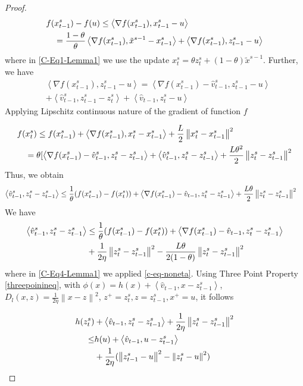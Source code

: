 \documentclass{article}
\newcommand{\norm}[1]{\left\lVert#1\right\rVert}
\newcommand{\Iprod}[2]{\left\langle #1,#2\right\rangle}
\theoremstyle{definition}
\theoremstyle{remark}
\begin{document}
{{\begin{proof}
\begin{align}
f(&x_{t-1}^s) -f (u) \leq \Iprod{\nabla f(x_{t-1}^s)}{x_{t-1}^s-u}\notag\\
&= \frac{1-\theta}{\theta} \Iprod{\nabla f(x_{t-1}^s)}{\tilde{x}^{s-1} - x_{t-1}^s} + \Iprod{\nabla f(x_{t-1}^s)}{z_{t-1}^s-u}\label{C-Eq1-Lemma1}
\end{align}
where in \eqref{C-Eq1-Lemma1} we use the update $x_t^s = \theta z_t^s+(1-\theta)\tilde{x}^{s-1}$. Further, we have
\begin{equation}\label{C-Eq3-Lemma1}
\begin{split}
&\Iprod{\nabla f(x_{t-1}^s)}{z_{t-1}^s - u} = \Iprod{\nabla f(x_{t-1}^s) - \hat{v}_{t-1}^s}{z_{t-1}^s - u}\\
&+ \Iprod{\hat{v}_{t-1}^s}{z_{t-1}^s - z_{t}^s} + \Iprod{\hat{v}_{t-1}}{z_{t}^s - u}
\end{split}
\end{equation}
Applying Lipschitz continuous nature of the gradient of function $f$ 

\begin{align}
f(&x_{t}^s)  \leq f(x_{t-1}^s) + \Iprod{\nabla f(x_{t-1}^s)}{x_{t}^s-x_{t-1}^s}+\frac{L}{2}\norm{x_{t}^s-x_{t-1}^s}^2\notag\\
&=\theta [\Iprod{\nabla f(x_{t-1}^s)-\hat{v}_{t-1}^s}{z_{t}^s-z_{t-1}^s}+ \Iprod{\hat{v}_{t-1}^s}{z_{t}^s-z_{t-1}^s}+\frac{L\theta^2}{2}\norm{z_{t}^s-z_{t-1}^s}^2\notag
\end{align}
Thus, we obtain
\begin{align}
\Iprod{\hat{v}_{t-1}^s}{z_{t}^s-z_{t-1}^s}&\leq \frac{1}{\theta} (f(x_{t-1}^s)  - f(x_{t}^s))+\Iprod{\nabla f(x_{t-1}^s)-\hat{v}_{t-1}}{z_{t}^s-z_{t-1}^s}+\frac{L\theta}{2}\norm{z_{t}^s-z_{t-1}^s}^2\notag
\end{align}
We have
\begin{align}
\Iprod{\hat{v}_{t-1}^s}{z_{t}^s-z_{t-1}^s}&\leq \frac{1}{\theta} (f(x_{t-1}^s)  - f(x_{t}^s))+\Iprod{\nabla f(x_{t-1}^s)-\hat{v}_{t-1}}{z_{t}^s-z_{t-1}^s}\notag\\
&+\frac{1}{2\eta}\norm{z_{t}^s-z_{t-1}^s}^2-\frac{L\theta}{2(1-\theta)}\norm{z_{t}^s-z_{t-1}^s}^2\label{C-Eq4-Lemma1}
\end{align}
where in \eqref{C-Eq4-Lemma1} we applied \eqref{c-eq-noneta}. Using Three Point Property \ref{threepoinineq}, with $\phi(x) = h(x)+\Iprod{\hat{v}_{t-1}}{x-z_{t-1}^s}$, $D_l(x,z) = {\frac{1}{2\eta}}\norm{x-z}^2$, $z^+ = z_t^s, z = z_{t-1}^s, x^+ = u$, it follows

\begin{align}
h(z_{t}^s) &+ \Iprod{\hat{v}_{t-1}}{z_{t}^s-z_{t-1}^s}+{\frac{1}{2\eta}}\norm{z_{t}^s-z_{t-1}^s}^2  \notag\\
\leq& h(u)+\Iprod{\hat{v}_{t-1}}{u - z_{t-1}^s}\notag\\
&+{\frac{1}{2\eta}}(\norm{z_{t-1}^s-u}^2-\norm{z_{t}^s-u}^2)\label{C-Eq4-1-Lemma1}  
\end{align}



\end{proof}}}
\end{document}
